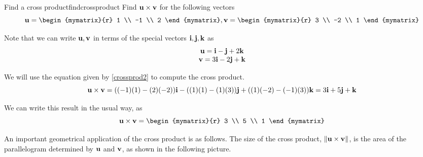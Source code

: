 \begin{example}{Find a cross product}{findcrossproduct}
Find ${\bf u} \times {\bf v}$ for the following vectors
\begin{equation*}
\vect{u}
=
\begin{mymatrix}{r}
1 \\
-1 \\
2
\end{mymatrix},
\vect{v}
=
\begin{mymatrix}{r}
3 \\
-2 \\
1
\end{mymatrix}
\end{equation*}
\end{example}

\begin{solution}
Note that we can write ${\bf u}, {\bf v}$ in terms of the special vectors ${\bf i},
{\bf j}, {\bf k}$ as 
\begin{equation*}
\begin{array}{c}
{\bf u}
=
{\bf i}-{\bf j}+2{\bf k} \\
{\bf v}
=
 3{\bf i}-2{\bf j}+{\bf k}
\end{array}
\end{equation*}

We will use the equation given by \ref{crossprod2} to compute the cross product. 
\begin{equation*}
{\bf u} \times {\bf v}
=((-1)(1)-(2)(-2)) {\bf i}- ((1)(1)-(1)(3)) {\bf j}+((1)(-2)-(-1)(3)) {\bf k}=3{\bf i}+5{\bf j}+{\bf k}
\end{equation*}

We can write this result in the usual way, as
\begin{equation*}
\vect{u} \times \vect{v}
=
\begin{mymatrix}{r}
3 \\
5 \\
1
\end{mymatrix}
\end{equation*}

\end{solution}

An important geometrical application of the cross product is as follows. The size of the cross product, $\|{\bf u}\times {\bf v}\| $, is the area of the
parallelogram determined by ${\bf u}$ and ${\bf v}$, as shown in the following picture. 

\begin{center}
\end{center}

